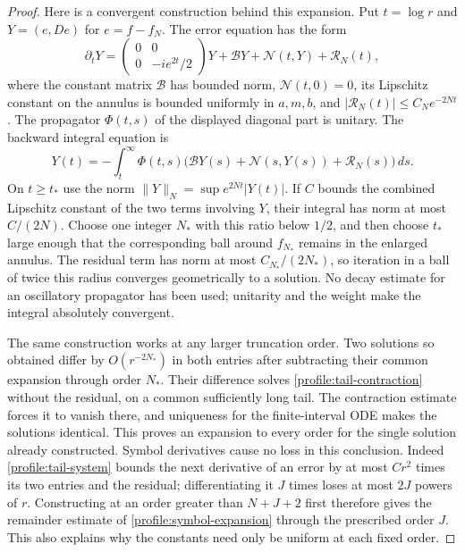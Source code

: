 \begin{proof}
Here is a convergent construction behind this expansion.  Put $t=\log r$
and $Y=(e,De)$ for $e=f-f_N$.  The error equation has the form
\begin{equation}\label{profile:tail-system}
 \partial_tY=
 \begin{pmatrix}0&0\\0&-ie^{2t}/2\end{pmatrix}Y
       +\mathcal B Y+\mathcal N(t,Y)+\mathcal R_N(t),
\end{equation}
where the constant matrix $\mathcal B$ has bounded norm,
$\mathcal N(t,0)=0$, its Lipschitz constant on the annulus is bounded
uniformly in $a,m,b$, and
$|\mathcal R_N(t)|\le C_Ne^{-2Nt}$.  The propagator $\Phi(t,s)$ of the
displayed diagonal part is unitary.  The backward integral equation is
\begin{equation}\label{profile:tail-contraction}
 Y(t)=-\int_t^\infty\Phi(t,s)
       \big(\mathcal B Y(s)+\mathcal N(s,Y(s))+\mathcal R_N(s)\big)\,ds.
\end{equation}
On $t\ge t_*$ use the norm
$\|Y\|_N=\sup e^{2Nt}|Y(t)|$.  If $C$ bounds the combined Lipschitz
constant of the two terms involving $Y$, their integral has norm at
most $C/(2N)$.  Choose one integer $N_*$ with this ratio below $1/2$,
and then choose $t_*$ large enough that the corresponding ball around
$f_{N_*}$ remains in the enlarged annulus.  The residual term has norm
at most $C_{N_*}/(2N_*)$, so iteration in a ball of twice this radius
converges geometrically to a solution.  No decay estimate for an
oscillatory propagator has been used; unitarity and the weight make the
integral absolutely convergent.

The same construction works at any larger truncation order.  Two
solutions so obtained differ by $O(r^{-2N_*})$ in both entries after
subtracting their common expansion through order $N_*$.  Their
difference solves \eqref{profile:tail-contraction} without the residual,
on a common sufficiently long tail.  The contraction estimate forces
it to vanish there, and uniqueness for the finite-interval ODE makes
the solutions identical.  This proves an expansion to every order for
the single solution already constructed.  Symbol derivatives cause no
loss in this conclusion.  Indeed \eqref{profile:tail-system} bounds the
next derivative of an error by at most $C r^2$ times its two entries and
the residual; differentiating it $J$ times loses at most $2J$ powers of
$r$.  Constructing at an order greater than $N+J+2$ first therefore
gives the remainder estimate of \eqref{profile:symbol-expansion} through
the prescribed order $J$.  This also explains why the constants need
only be uniform at each fixed order.


\end{proof}
